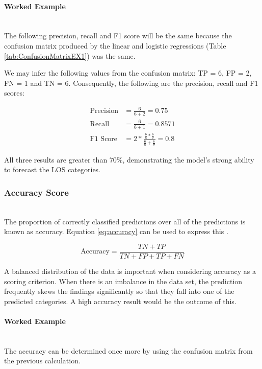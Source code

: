 \documentclass[../thesis.tex]{subfiles}
\begin{document}
\paragraph{Worked Example}\\
The following precision, recall and F1 score will be the same because the confusion matrix produced by the linear and logistic regressions (Table \ref{tab:ConfusionMatrixEX1}) was the same.

We may infer the following values from the confusion matrix: TP = 6, FP = 2, FN = 1 and TN = 6. Consequently, the following are the precision, recall and F1 scores:

\begin{align}
    \text{Precision} &= \frac{6}{6+2}= 0.75\\
    \text{Recall} &= \frac{6}{6+1}= 0.8571\\
    \text{F1 Score} &= 2 * \frac{\frac{6}{8} * \frac{6}{7}}{\frac{6}{8} + \frac{6}{7}}= 0.8
\end{align}

All three results are greater than 70\%, demonstrating the model's strong ability to forecast the LOS categories.


\subsubsection{Accuracy Score}\\
The proportion of correctly classified predictions over all of the predictions is known as accuracy. Equation \eqref{eq:accuracy} can be used to express this \cite{Baratloo2015}.

\begin{equation}\label{eq:accuracy}
    \text{Accuracy} = \frac{TN + TP}{TN + FP + TP + FN}
\end{equation}

A balanced distribution of the data is important when considering accuracy as a scoring criterion. When there is an imbalance in the data set, the prediction frequently skews the findings significantly so that they fall into one of the predicted categories. A high accuracy result would be the outcome of this.

\paragraph{Worked Example}\\
The accuracy can be determined once more by using the confusion matrix from the previous calculation.
\end{document}

